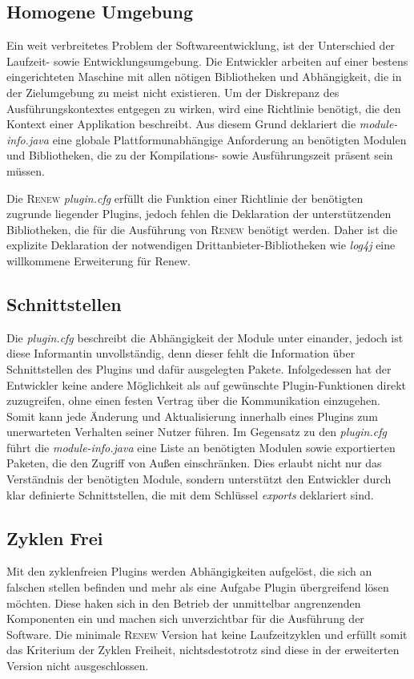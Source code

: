 	\subsection{Homogene Umgebung} %
		Ein weit verbreitetes Problem der Softwareentwicklung, ist der Unterschied der Laufzeit- sowie Entwicklungsumgebung. Die Entwickler arbeiten auf einer bestens eingerichteten Maschine mit allen nötigen Bibliotheken und Abhängigkeit, die in der Zielumgebung zu meist nicht existieren. Um der Diskrepanz des Ausführungskontextes entgegen zu wirken, wird eine Richtlinie benötigt, die den Kontext einer Applikation beschreibt. Aus diesem Grund deklariert die \textit{module-info.java} eine globale Plattformunabhängige Anforderung an benötigten Modulen und Bibliotheken, die zu der Kompilations- sowie Ausführungszeit präsent sein müssen.\bigbreak

		Die \textsc{Renew} \textit{plugin.cfg} erfüllt die Funktion einer Richtlinie der benötigten zugrunde liegender Plugins, jedoch fehlen die Deklaration der unterstützenden Bibliotheken, die für die Ausführung von \textsc{Renew} benötigt werden. Daher ist die explizite Deklaration der notwendigen Drittanbieter-Bibliotheken wie \textit{log4j} eine willkommene Erweiterung für Renew. 


	\subsection{Schnittstellen} %
		Die \textit{plugin.cfg} beschreibt die Abhängigkeit der Module unter einander, jedoch ist diese Informantin unvollständig, denn dieser fehlt die Information über Schnittstellen des Plugins und dafür ausgelegten Pakete. Infolgedessen hat der Entwickler keine andere Möglichkeit als auf gewünschte Plugin-Funktionen direkt zuzugreifen, ohne einen festen Vertrag über die Kommunikation einzugehen. Somit kann jede Änderung und Aktualisierung innerhalb eines Plugins zum unerwarteten Verhalten seiner Nutzer führen. \newline
		Im Gegensatz zu den \textit{plugin.cfg} führt die \textit{module-info.java} eine Liste an benötigten Modulen sowie exportierten Paketen, die den Zugriff von Außen einschränken. Dies erlaubt nicht nur das Verständnis der benötigten Module, sondern unterstützt den Entwickler durch klar definierte Schnittstellen, die mit dem Schlüssel \textit{exports} deklariert sind.

	\subsection{Zyklen Frei} %
		Mit den zyklenfreien Plugins werden Abhängigkeiten aufgelöst, die sich an falschen stellen befinden und mehr als eine Aufgabe Plugin übergreifend lösen möchten. Diese haken sich in den Betrieb der unmittelbar angrenzenden Komponenten ein und machen sich unverzichtbar für die Ausführung der Software. Die minimale \textsc{Renew} Version hat keine Laufzeitzyklen und erfüllt somit das Kriterium der Zyklen Freiheit, nichtsdestotrotz sind diese in der erweiterten Version nicht ausgeschlossen.


